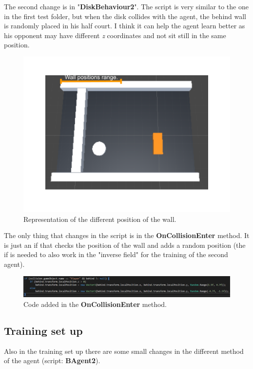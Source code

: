 \documentclass[12pt]{article}
\begin{document}
	\noindent
	The second change is in "\textbf{DiskBehaviour2}". The script is very similar to the one in the first test folder, but when the disk collides with the agent, the behind wall is randomly placed in his half court. I think it can help the agent learn better as his opponent may have different \textit{z} coordinates and not sit still in the same position.
	
	\begin{figure}[hbt!]
		\centering
		\includegraphics[width= 0.82
		\textwidth]{images/BehindWall.png}
		\caption{Representation of the different position of the wall.}
	\end{figure}
	
	\noindent
	The only thing that changes in the script is in the \textbf{OnCollisionEnter} method. It is just an if that checks the position of the wall and adds a random position (the if is needed to also work in the "inverse field" for the training of the second agent).
	
	\begin{figure}[hbt!]
		\centering
		\includegraphics[width= 1.25
		\textwidth]{images/DiskBehaviour2.png}
		\caption{Code added in the \textbf{OnCollisionEnter} method.}
	\end{figure}

	\subsection{Training set up}
	
	Also in the training set up there are some small changes in the different method of the agent (script: \textbf{BAgent2}).
	
\end{document}
